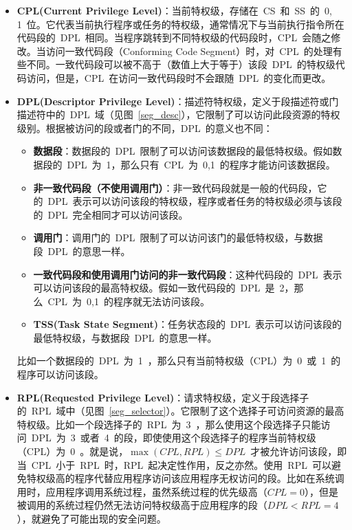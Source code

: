 \begin{itemize}
\item{\textbf{CPL(Current Privilege Level)}}：当前特权级，存储在~CS~和~SS~的~0, 1~位。它代表当前执行程序或任务的特权级，通常情况下与当前执行指令所在代码段的~DPL~相同。当程序跳转到不同特权级的代码段时，CPL~会随之修改。当访问一致代码段（Conforming Code Segment）时，对~CPL~的处理有些不同。一致代码段可以被不高于（数值上大于等于）该段~DPL~的特权级代码访问，但是，CPL~在访问一致代码段时不会跟随~DPL~的变化而更改。
\item{\textbf{DPL(Descriptor Privilege Level)}}：描述符特权级，定义于段描述符或门描述符中的~DPL~域（见图~\ref{seg_desc}），它限制了可以访问此段资源的特权级别。根据被访问的段或者门的不同，DPL~的意义也不同：
  \begin{itemize}
  \item{\textbf{数据段}}：数据段的~DPL~限制了可以访问该数据段的最低特权级。假如数据段的~DPL~为~1，那么只有~CPL~为~0,1~的程序才能访问该数据段。
  \item{\textbf{非一致代码段（不使用调用门）}}：非一致代码段就是一般的代码段，它的~DPL~表示可以访问该段的特权级，程序或者任务的特权级必须与该段的~DPL~完全相同才可以访问该段。
  \item{\textbf{调用门}}：调用门的~DPL~限制了可以访问该门的最低特权级，与数据段~DPL~的意思一样。
  \item{\textbf{一致代码段和使用调用门访问的非一致代码段}}：这种代码段的~DPL~表示可以访问该段的最高特权级。假如一致代码段的~DPL~是~2，那么~CPL~为~0,1~的程序就无法访问该段。
  \item{\textbf{TSS(Task State Segment)}}：任务状态段的~DPL~表示可以访问该段的最低特权级，与数据段~DPL~的意思一样。
  \end{itemize}
比如一个数据段的~DPL~为~1~，那么只有当前特权级（CPL）为~0~或~1~的程序可以访问该段。
\item{\textbf{RPL(Requested Privilege Level)}}：请求特权级，定义于段选择子的~RPL~域中（见图~\ref{seg_selector}）。它限制了这个选择子可访问资源的最高特权级。比如一个段选择子的~RPL~为~3~，那么使用这个段选择子只能访问~DPL~为~3~或者~4~的段，即使使用这个段选择子的程序当前特权级（CPL）为~0~。就是说，$\max{(CPL, RPL)}\le DPL$~才被允许访问该段，即当~CPL~小于~RPL~时，RPL~起决定性作用，反之亦然。使用~RPL~可以避免特权级高的程序代替应用程序访问该应用程序无权访问的段。比如在系统调用时，应用程序调用系统过程，虽然系统过程的优先级高（$CPL=0$），但是被调用的系统过程仍然无法访问特权级高于应用程序的段（$DPL<RPL=4$），就避免了可能出现的安全问题。
\end{itemize}

